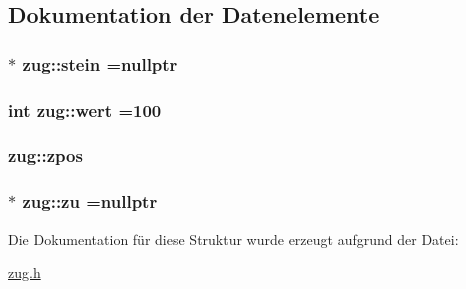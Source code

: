 \subsection{Dokumentation der Datenelemente}
\hypertarget{structzug_a4b431b73a9dbcfd9b2c20afb66f76998}{}
\subsubsection[{stein}]{$\ast$ zug\+::stein =nullptr}\label{structzug_a4b431b73a9dbcfd9b2c20afb66f76998}
\hypertarget{structzug_adea5273c99ffd5fb46a9f5367a0fef3e}{}
\subsubsection[{wert}]{\setlength{\rightskip}{0pt plus 5cm}int zug\+::wert =100}\label{structzug_adea5273c99ffd5fb46a9f5367a0fef3e}
\hypertarget{structzug_a849eec23abc7f17b4241197f48683bc8}{}
\subsubsection[{zpos}]{ zug\+::zpos}\label{structzug_a849eec23abc7f17b4241197f48683bc8}
\hypertarget{structzug_aa1d47432b331308a510572187bfbe0ec}{}
\subsubsection[{zu}]{$\ast$ zug\+::zu =nullptr}\label{structzug_aa1d47432b331308a510572187bfbe0ec}


Die Dokumentation für diese Struktur wurde erzeugt aufgrund der Datei\+:\begin{DoxyCompactItemize}
\item 
\hyperlink{zug_8h}{zug.\+h}\end{DoxyCompactItemize}
